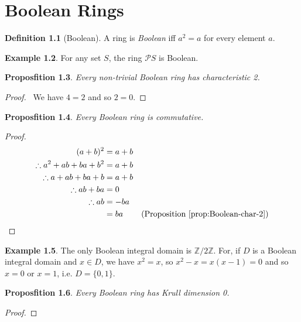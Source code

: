 \documentclass{book}
\let\qed\relax
\newtheorem{prop}{Proposfition}[chapter]
\theoremstyle{definition}
\newtheorem{df}[prop]{Definition}
\newtheorem{ex}[prop]{Example}
\begin{document}
\chapter{Boolean Rings}

\begin{df}[Boolean]
A ring is \emph{Boolean} iff $a^2 = a$ for every element $a$.
\end{df}

\begin{ex}
For any set $S$, the ring $\mathcal{P} S$ is Boolean.
\end{ex}

\begin{prop}
\label{prop:Boolean-char-2}
Every non-trivial Boolean ring has characteristic 2.
\end{prop}

\begin{proof}
\pf\ We have $4 = 2$ and so $2 = 0$. \qed
\end{proof}

\begin{prop}
Every Boolean ring is commutative.
\end{prop}

\begin{proof}
\pf
\begin{align*}
(a+b)^2 & = a+b \\
\therefore a^2 + ab + ba + b^2 & = a+b \\
\therefore a + ab + ba + b & = a + b \\
\therefore ab + ba & = 0 \\
\therefore ab & = -ba \\
& = ba & (\text{Proposition \ref{prop:Boolean-char-2}})
\end{align*}
\end{proof}

\begin{ex}
The only Boolean integral domain is $\mathbb{Z} / 2 \mathbb{Z}$. For, if $D$ is a Boolean integral domain and $x \in D$, we have $x^2 = x$, so $x^2 - x = x(x-1) = 0$ and so $x = 0$ or $x = 1$, i.e. $D = \{0,1\}$.
\end{ex}

\begin{prop}
Every Boolean ring has Krull dimension 0.
\end{prop}

\begin{proof}
\pf
{}
\qed
\end{proof}
\end{document}
